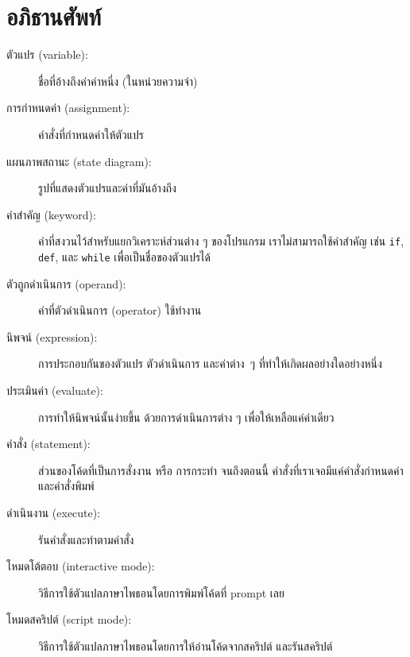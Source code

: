 \section{อภิธานศัพท์}

\begin{description}

\item[ตัวแปร (variable):]  ชื่อที่อ้างถึงค่าค่าหนึ่ง (ในหน่วยความจำ)

\item[การกำหนดค่า (assignment):]  คำสั่งที่กำหนดค่าให้ตัวแปร

\item[แผนภาพสถานะ (state diagram):]  รูปที่แสดงตัวแปรและค่าที่มันอ้างถึง

\item[คำสำคัญ (keyword):]  คำที่สงวนไว้สำหรับแยกวิเคราะห์ส่วนต่าง ๆ ของโปรแกรม 
เราไม่สามารถใช้คำสำคัญ เช่น {\tt if}, {\tt  def}, และ {\tt while} เพื่อเป็นชื่อของตัวแปรได้

\item[ตัวถูกดำเนินการ (operand):] ค่าที่ตัวดำเนินการ (operator) ใช้ทำงาน

\item[นิพจน์ (expression):]  การประกอบกันของตัวแปร ตัวดำเนินการ และค่าต่าง~ๆ 
ที่ทำให้เกิดผลอย่างใดอย่างหนึ่ง

\item[ประเมินค่า (evaluate):]  การทำให้นิพจน์นั้นง่ายขึ้น ด้วยการดำเนินการต่าง ๆ 
เพื่อให้เหลือแค่ค่าเดียว

\item[คำสั่ง (statement):]  ส่วนของโค้ดที่เป็นการสั่งงาน หรือ การกระทำ จนถึงตอนนี้ 
คำสั่งที่เราเจอมีแค่คำสั่งกำหนดค่าและคำสั่งพิมพ์

\item[ดำเนินงาน (execute):]  รันคำสั่งและทำตามคำสั่ง

\item[โหมดโต้ตอบ (interactive mode):] วิธีการใช้ตัวแปลภาษาไพธอนโดยการพิมพ์โค้ดที่ prompt เลย

\item[โหมดสคริปต์ (script mode):] วิธีการใช้ตัวแปลภาษาไพธอนโดยการให้อ่านโค้ดจากสคริปต์
และรันสคริปต์


\end{description}
